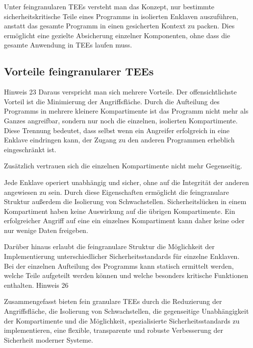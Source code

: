 Unter feingranularen TEEs versteht man das Konzept, nur bestimmte sicherheitskritische Teile eines Programms in isolierten Enklaven auszuführen, anstatt das gesamte Programm in einen gesicherten Kontext zu packen. Dies ermöglicht eine gezielte Absicherung einzelner Komponenten, ohne dass die gesamte Anwendung in TEEs laufen muss.

\subsection{Vorteile feingranularer TEEs}
Hinweis 23
Daraus verspricht man sich mehrere Vorteile. Der offensichtlichste Vorteil ist die Minimierung der Angriffsfläche. Durch die Aufteilung des Programms in mehrere kleinere Kompartimente ist das Programm nicht mehr als Ganzes angreifbar, sondern nur noch die einzelnen, isolierten Kompartimente. Diese Trennung bedeutet, dass selbst wenn ein Angreifer erfolgreich in eine Enklave eindringen kann, der Zugang zu den anderen Programmen erheblich eingeschränkt ist. 

Zusätzlich vertrauen sich die einzelnen Kompartimente nicht mehr Gegenseitig.

Jede Enklave operiert unabhängig und sicher, ohne auf die Integrität der anderen angewiesen zu sein. Durch diese Eigenschaften ermöglicht die feingranulare Struktur außerdem die Isolierung von Schwachstellen. Sicherheitslücken in einem Kompartiment haben keine Auswirkung auf die übrigen Kompartimente. Ein erfolgreicher Angriff auf eine ein einzelnes Kompartiment kann daher keine oder nur wenige Daten freigeben.

Darüber hinaus erlaubt die feingranulare Struktur die Möglichkeit der Implementierung unterschiedlicher Sicherheitsstandards für einzelne Enklaven. Bei der einzelnen Aufteilung des Programms kann statisch ermittelt werden, welche Teile aufgeteilt werden können und welche besonders kritische Funktionen enthalten.
Hinweis 26

Zusammengefasst bieten fein granulare TEEs durch die Reduzierung der Angriffsfläche, die Isolierung von Schwachstellen, die gegenseitige Unabhängigkeit der Kompartimente und die Möglichkeit, spezialisierte Sicherheitsstandards zu implementieren, eine flexible, transparente und robuste Verbesserung der Sicherheit moderner Systeme.